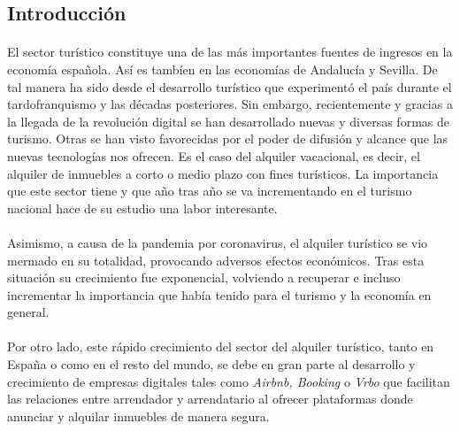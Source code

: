 \documentclass[a4paper,10pt]{article}
\begin{document}
    \vspace{3mm}
    \setlength{\columnsep}{0.88cm}
    \begin{multicols}{2}
    
        \section{Introducción}

            \paragraph*{}
            El sector turístico constituye una de las más importantes fuentes de ingresos en la economía española. Así es tambíen en las economías de Andalucía y
            Sevilla. De tal manera ha sido desde el desarrollo turístico que experimentó el país durante el tardofranquismo y las décadas posteriores. Sin embargo, 
            recientemente y gracias a la llegada de la revolución digital se han desarrollado nuevas y diversas formas de turismo. Otras se han visto favorecidas
            por el poder de difusión y alcance que las nuevas tecnologías nos ofrecen. Es el caso del alquiler vacacional, es decir, el alquiler de inmuebles a
            corto o medio plazo con fines turísticos. La importancia que este sector tiene y que año tras año se va incrementando en el turismo nacional hace de 
            su estudio una labor interesante.
            
            \paragraph*{}
            Asimismo, a causa de la pandemia por coronavirus, el alquiler turístico se vio mermado en su totalidad, 
            provocando adversos efectos económicos. Tras esta situación su crecimiento fue exponencial, volviendo a recuperar e incluso incrementar la importancia
            que había tenido para el turismo y la economía en general.

            \paragraph*{}
            Por otro lado, este rápido crecimiento del sector del alquiler turístico, tanto en España o como en el resto del mundo, se debe en gran parte al 
            desarrollo y crecimiento de empresas digitales tales como \textit{Airbnb, Booking} o \textit{Vrbo} que facilitan las relaciones entre
            arrendador y arrendatario al ofrecer plataformas donde anunciar y alquilar inmuebles de manera segura.


\end{multicols}
\end{document}
